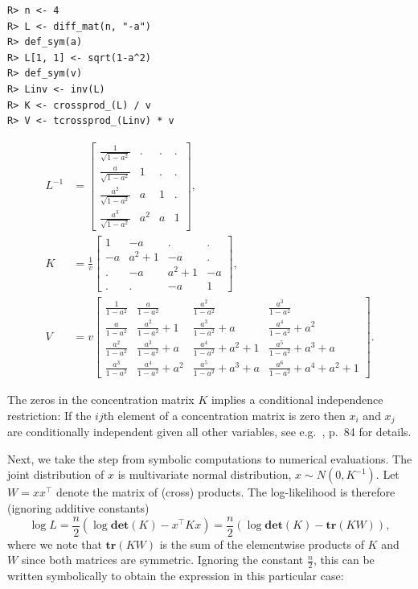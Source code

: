 \begin{verbatim}
R> n <- 4
R> L <- diff_mat(n, "-a")
R> def_sym(a)
R> L[1, 1] <- sqrt(1-a^2)
R> def_sym(v)
R> Linv <- inv(L)
R> K <- crossprod_(L) / v
R> V <- tcrossprod_(Linv) * v
\end{verbatim}

\begin{align} 
    L^{-1} &= \left[\begin{matrix}\frac{1}{\sqrt{1 - a^{2}}} & . & . & .\\\frac{a}{\sqrt{1 - a^{2}}} & 1 & . & .\\\frac{a^{2}}{\sqrt{1 - a^{2}}} & a & 1 & .\\\frac{a^{3}}{\sqrt{1 - a^{2}}} & a^{2} & a & 1\end{matrix}\right] , \\ 
    K &= \frac{1}{v}  \left[\begin{matrix}1 & - a & . & .\\- a & a^{2} + 1 & - a & .\\. & - a & a^{2} + 1 & - a\\. & . & - a & 1\end{matrix}\right] , \\ 
    V &= v  \left[\begin{matrix}\frac{1}{1 - a^{2}} & \frac{a}{1 - a^{2}} & \frac{a^{2}}{1 - a^{2}} & \frac{a^{3}}{1 - a^{2}}\\\frac{a}{1 - a^{2}} & \frac{a^{2}}{1 - a^{2}} + 1 & \frac{a^{3}}{1 - a^{2}} + a & \frac{a^{4}}{1 - a^{2}} + a^{2}\\\frac{a^{2}}{1 - a^{2}} & \frac{a^{3}}{1 - a^{2}} + a & \frac{a^{4}}{1 - a^{2}} + a^{2} + 1 & \frac{a^{5}}{1 - a^{2}} + a^{3} + a\\\frac{a^{3}}{1 - a^{2}} & \frac{a^{4}}{1 - a^{2}} + a^{2} & \frac{a^{5}}{1 - a^{2}} + a^{3} + a & \frac{a^{6}}{1 - a^{2}} + a^{4} + a^{2} + 1\end{matrix}\right]  .
  \end{align}

The zeros in the concentration matrix \(K\) implies a conditional
independence restriction: If the \(ij\)th element of a concentration
matrix is zero then \(x_i\) and \(x_j\) are conditionally independent
given all other variables, see e.g.~\cite{hojsgaard}, p.~84 for
details.

Next, we take the step from symbolic computations to numerical
evaluations. The joint distribution of \(x\) is multivariate normal
distribution, \(x\sim N(0, K^{-1})\). Let \(W=x x^\top\) denote the
matrix of (cross) products. The log-likelihood is therefore (ignoring
additive constants)
\[ 
\log L = \frac n 2 (\log \mathbf{det}(K) - x^\top K x) = \frac n 2 (\log \mathbf{det}(K) - \mathbf{tr}(K W)), 
\]
where we note that \(\mathbf{tr}(KW)\) is the
sum of the elementwise products of \(K\) and \(W\) since both matrices are
symmetric. Ignoring the constant \(\frac n 2\),
this can be written symbolically to obtain the expression in
this particular case:

